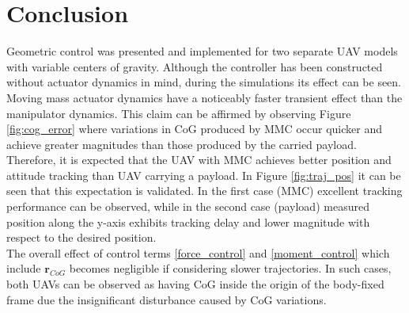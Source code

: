\section{Conclusion} \label{sec:conclusion}
Geometric control was presented and implemented for two separate UAV models with variable centers of gravity. Although the controller has been constructed without actuator dynamics in mind, during the simulations its effect can be seen. \\
Moving mass actuator dynamics have a noticeably faster transient effect than the manipulator dynamics. This claim can be affirmed by observing Figure \ref{fig:cog_error} where variations in CoG produced by MMC occur quicker and achieve greater magnitudes than those produced by the carried payload. Therefore, it is expected that the UAV with MMC achieves better position and attitude tracking than UAV carrying a payload. In Figure \ref{fig:traj_pos} it can be seen that this expectation is validated. In the first case (MMC) excellent tracking performance can be observed, while in the second case (payload) measured position along the y-axis exhibits tracking delay and lower magnitude with respect to the desired position. \\
The overall effect of control terms \eqref{force_control} and \eqref{moment_control} which include $\textbf{r}_{CoG}$ becomes negligible if considering slower trajectories. In such cases, both UAVs can be observed as having CoG inside the origin of the body-fixed frame due the insignificant disturbance caused by CoG variations. 
